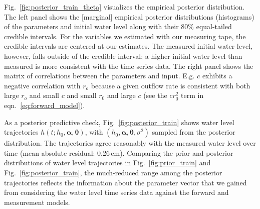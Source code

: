 \documentclass[a4paper,fleqn]{cas-dc}
\newcommand\themodel {$h(t; h_0, \boldsymbol \alpha, \boldsymbol\theta)$\xspace}
\newcommand\thevars{h_0, \boldsymbol \alpha, \boldsymbol \theta, \sigma^2}
\begin{document}

Fig.~\ref{fig:posterior_train_theta} visualizes the empirical posterior distribution. 
The left panel shows the [marginal] empirical posterior distributions (histograms) of the parameters and initial water level along with their 80\% equal-tailed credible intervals. 
For the variables we estimated with our measuring tape, the credible intervals are centered at our estimates. 
The measured initial water level, however, falls outside of the credible interval; a higher initial water level than measured is more consistent with the time series data.
The right panel shows the matrix of correlations between the parameters and input. E.g. $c$ exhibits a negative correlation with $r_o$ because a given outflow rate is consistent with both large $r_o$ and small $c$ and small $r_0$ and large $c$ (see the $cr_0^2$ term in eqn.~\ref{eq:forward_model}).



As a posterior predictive check, Fig.~\ref{fig:posterior_train} shows water level trajectories \themodel, with $(\thevars)$ sampled from the posterior distribution. The trajectories agree reasonably with the measured water level over time (mean absolute residual: 0.26\,cm). 
Comparing the prior and posterior distributions of water level trajectories in Fig.~\ref{fig:prior_train} and Fig.~\ref{fig:posterior_train}, the much-reduced range among the posterior trajectories reflects the information about the parameter vector that we gained from considering the water level time series data against the forward and measurement models.
\end{document}
